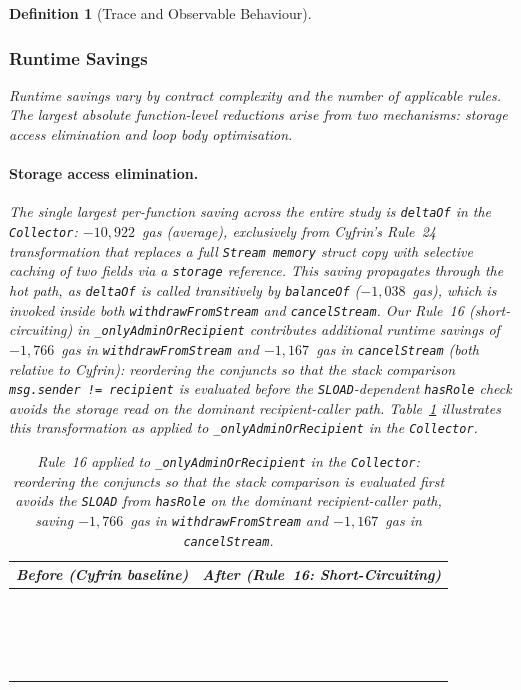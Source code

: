 \documentclass[manuscript,screen,review]{acmart}
\newtheorem{definition}{Definition}
\begin{document}
\begin{definition}[Trace and Observable Behaviour]
\subsubsection{Runtime Savings}
\label{sssec:runtime_savings}

Runtime savings vary by contract complexity and the number of applicable
rules. The largest absolute function-level reductions arise from two
mechanisms: storage access elimination and loop body optimisation.

\paragraph{Storage access elimination.}
The single largest per-function saving across the entire study is
\texttt{deltaOf} in the \texttt{Collector}: $-10{,}922$~gas (average),
exclusively from Cyfrin's Rule~24 transformation that replaces a full
\texttt{Stream memory} struct copy with selective caching of two fields via a
\texttt{storage} reference. This saving propagates through the hot path, as
\texttt{deltaOf} is called transitively by \texttt{balanceOf}
($-1{,}038$~gas), which is
invoked inside both \texttt{withdrawFromStream} and \texttt{cancelStream}.
Our Rule~16 (short-circuiting) in \texttt{\_onlyAdminOrRecipient}
contributes additional runtime savings of $-1{,}766$~gas in
\texttt{withdrawFromStream} and $-1{,}167$~gas in \texttt{cancelStream}
(both relative to Cyfrin): reordering the conjuncts so that the stack
comparison \texttt{msg.sender != recipient} is evaluated before the
\texttt{SLOAD}-dependent \texttt{hasRole} check avoids the storage read on
the dominant recipient-caller path. Table~\ref{tab:rule16_example}
illustrates this transformation as applied to
\texttt{\_onlyAdminOrRecipient} in the \texttt{Collector}.

\begin{table}[htb]
\caption{Rule~16 applied to \texttt{\_onlyAdminOrRecipient} in the
  \texttt{Collector}: reordering the conjuncts so that the stack comparison
  is evaluated first avoids the \texttt{SLOAD} from \texttt{hasRole} on the
  dominant recipient-caller path, saving $-1{,}766$~gas in
  \texttt{withdrawFromStream} and $-1{,}167$~gas in \texttt{cancelStream}.}
\label{tab:rule16_example}
\centering
\begin{footnotesize}
\begin{tabular}{|p{}|p{}|}
\hline
\rowcolor[HTML]{EFEFEF}
\textbf{Before (Cyfrin baseline)} & \textbf{After (Rule~16: Short-Circuiting)} \\ \hline
\vspace*{-0.5cm}
\begin{verbatim}




\end{verbatim}
\end{tabular}
\end{footnotesize}
\end{table}
\end{definition}
\end{document}
